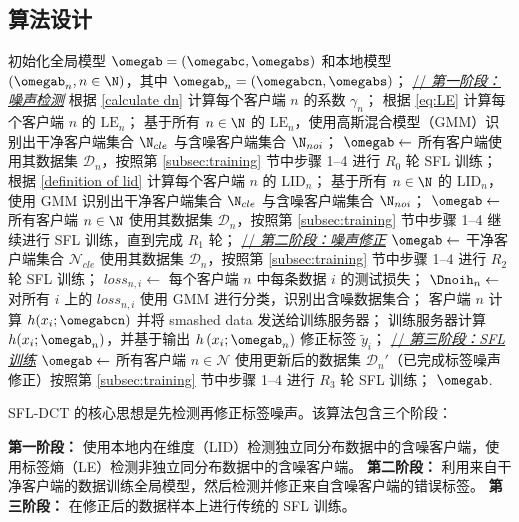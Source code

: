 \subsection{算法设计}
\begin{algorithm}[t]
\caption{SFL-DCT 算法}\label{alg1}
\begin{algorithmic}[1]
\STATE 初始化全局模型 $\omegab=(\omegabc,\omegabs)$ 和本地模型 $(\omegab_n, n\in\N)$，其中 $\omegab_n = (\omegabcn, \omegabs)$；
\STATE \underline{// \textit{第一阶段：噪声检测}}
\STATE 根据 \eqref{calculate dn} 计算每个客户端 $n$ 的系数 $\gamma_n$；
\STATE 根据 \eqref{eq:LE} 计算每个客户端 $n$ 的 $\text{LE}_n$；
\STATE 基于所有 $n\in\N$ 的 $\text{LE}_{n}$，使用高斯混合模型（GMM）识别出干净客户端集合 $\N_{cle}$ 与含噪客户端集合 $\N_{noi}$；
\ELSE
\STATE $\omegab\leftarrow$ 所有客户端使用其数据集 $\mathcal{D}_n$，按照第 \ref{subsec:training} 节中步骤 1--4 进行 $R_0$ 轮 SFL 训练；
\STATE 根据 \eqref{definition of lid} 计算每个客户端 $n$ 的 $\text{LID}_n$；
\STATE 基于所有 $n\in\N$ 的 $\text{LID}_{n}$，使用 GMM 识别出干净客户端集合 $\N_{cle}$ 与含噪客户端集合 $\N_{noi}$；
\ENDIF
\STATE $\omegab\leftarrow$ 所有客户端 $n\in\N$ 使用其数据集 $\mathcal{D}_n$，按照第 \ref{subsec:training} 节中步骤 1--4 继续进行 SFL 训练，直到完成 $R_1$ 轮；
\STATE \underline{// \textit{第二阶段：噪声修正}}
\STATE $\omegab\leftarrow$ 干净客户端集合 $\mathcal{N}_{cle}$ 使用其数据集 $\mathcal{D}_n$，按照第 \ref{subsec:training} 节中步骤 1--4 进行 $R_2$ 轮 SFL 训练；
\STATE $loss_{n,i} \leftarrow$ 每个客户端 $n$ 中每条数据 $i$ 的测试损失；
\STATE $\Dnoih_n\leftarrow$ 对所有 $i$ 上的 $loss_{n,i}$ 使用 GMM 进行分类，识别出含噪数据集合；
\STATE 客户端 $n$ 计算 $h(x_i;\omegabcn)$ 并将 smashed data 发送给训练服务器；
\STATE 训练服务器计算 $h(x_i;\omegab_n)$，并基于输出 $h\left(x_i;\omegab_n \right)$ 修正标签 $\tilde{y}_i$；
\ENDFOR
\ENDFOR
\STATE \underline{// \textit{第三阶段：SFL 训练}}
\STATE $\omegab\leftarrow$ 所有客户端 $n\in\mathcal{N}$ 使用更新后的数据集 $\mathcal{D}_n'$（已完成标签噪声修正）按照第 \ref{subsec:training} 节中步骤 1--4 进行 $R_3$ 轮 SFL 训练；
\RETURN $\omegab$.
\end{algorithmic}
\end{algorithm}

SFL-DCT 的核心思想是先检测再修正标签噪声。该算法包含三个阶段：

 \textbf{第一阶段：} 使用本地内在维度（LID）检测独立同分布数据中的含噪客户端，使用标签熵（LE）检测非独立同分布数据中的含噪客户端。
 \textbf{第二阶段：} 利用来自干净客户端的数据训练全局模型，然后检测并修正来自含噪客户端的错误标签。
 \textbf{第三阶段：} 在修正后的数据样本上进行传统的 SFL 训练。

